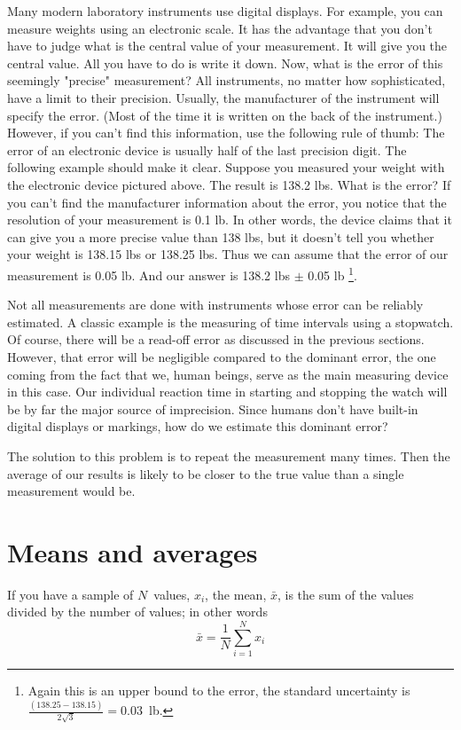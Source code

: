 Many modern laboratory instruments use digital displays. For example, you can measure weights using an electronic scale. It has the advantage that you don't have to judge what is the central value of your measurement. It will give you the central value. All you have to do is write it down. Now, what is the error of this seemingly "precise" measurement? All instruments, no matter how sophisticated, have a limit to their precision. Usually, the manufacturer of the instrument will specify the error. (Most of the time it is written on the back of the instrument.) However, if you can't find this information, use the following rule of thumb: The error of an electronic device is usually half of the last precision digit. The following example should make it clear. Suppose you measured your weight with the electronic device pictured above. The result is 138.2 lbs. What is the error? If you can't find the manufacturer information about the error, you notice that the resolution of your measurement is 0.1 lb. In other words, the device claims that it can give you a more precise value than 138 lbs, but it doesn't tell you whether your weight is 138.15 lbs or 138.25 lbs. Thus we can assume that the error of our measurement is 0.05 lb. And our answer is 138.2 lbs $\pm$ 0.05 lb \footnote{Again this is an upper bound to the error,  the standard uncertainty is $\frac{(138.25-138.15)}{2\sqrt{3}}=0.03$~lb.}.

Not all measurements are done with instruments whose error can be reliably estimated. A classic example is the measuring of time intervals using a stopwatch. Of course, there will be a read-off error as discussed in the previous sections. However, that error will be negligible compared to the dominant error, the one coming from the fact that we, human beings, serve as the main measuring device in this case. Our individual reaction time in starting and stopping the watch will be by far the major source of imprecision. Since humans don't have built-in digital displays or markings, how do we estimate this dominant error?

The solution to this problem is to repeat the measurement many times. Then the average of our results is likely to be closer to the true value than a single measurement would be. 

\section{Means and averages}
\label{mean}

If you have a sample of $N$~values, $x_i$, the mean, $\bar{x}$, is
the sum of the values divided by the number of values; in other words
%
\[ \bar{x} = \frac{1}{N} \sum_{i=1}^N x_i \]
%

